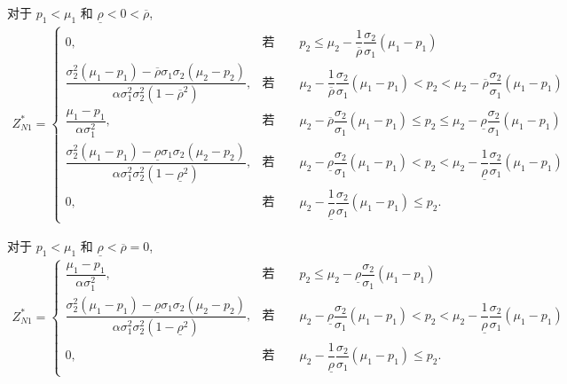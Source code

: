 \documentclass[10.0pt]{article}
\begin{document}
对于 $ p_1 < \mu_1 $ 和 $ \underline{\rho} < 0 < \overline{\rho} $,
{\footnotesize \begin{eqnarray}
Z_{N 1}^* = \left\{ \begin{matrix}
0, & \text{若} \qquad p_2 \leqslant \mu_2 - \dfrac1{\overline{\rho}} \dfrac{\sigma_2}{\sigma_1} (\mu_1 - p_1) \\
\dfrac{\sigma_2^2 (\mu_1 - p_1) - \overline{\rho} \sigma_1 \sigma_2 (\mu_2 - p_2)}{\alpha \sigma_1^2 \sigma_2^2 (1 - \overline{\rho}^2)}, & \text{若} \qquad \mu_2 - \dfrac1{\overline{\rho}} \dfrac{\sigma_2}{\sigma_1} (\mu_1 - p_1) < p_2 < \mu_2 - \overline{\rho} \dfrac{\sigma_2}{\sigma_1} (\mu_1 - p_1) \\
\dfrac{\mu_1 - p_1}{\alpha \sigma_1^2}, & \text{若} \qquad \mu_2 - \overline{\rho} \dfrac{\sigma_2}{\sigma_1} (\mu_1 - p_1) \leqslant p_2 \leqslant \mu_2 - \underline{\rho} \dfrac{\sigma_2}{\sigma_1} (\mu_1 - p_1) \\
\dfrac{\sigma_2^2 (\mu_1 - p_1) - \underline{\rho} \sigma_1 \sigma_2 (\mu_2 - p_2)}{\alpha \sigma_1^2 \sigma_2^2 (1 - \underline{\rho}^2)}, & \text{若} \qquad \mu_2 - \underline{\rho} \dfrac{\sigma_2}{\sigma_1} (\mu_1 - p_1) < p_2 < \mu_2 - \dfrac1{\underline{\rho}} \dfrac{\sigma_2}{\sigma_1} (\mu_1 - p_1) \\
0, & \text{若} \qquad \mu_2 - \dfrac1{\underline{\rho}} \dfrac{\sigma_2}{\sigma_1} (\mu_1 - p_1) \leqslant p_2.
\end{matrix} \right.
\end{eqnarray}}

对于 $ p_1 < \mu_1 $ 和 $ \underline{\rho} < \overline{\rho} = 0 $,
{\footnotesize \begin{eqnarray}
Z_{N 1}^* = \left\{ \begin{matrix}
\dfrac{\mu_1 - p_1}{\alpha \sigma_1^2}, & \text{若} \qquad p_2 \leqslant \mu_2 - \underline{\rho} \dfrac{\sigma_2}{\sigma_1} (\mu_1 - p_1) \\
\dfrac{\sigma_2^2 (\mu_1 - p_1) - \underline{\rho} \sigma_1 \sigma_2 (\mu_2 - p_2)}{\alpha \sigma_1^2 \sigma_2^2 (1 - \underline{\rho}^2)}, & \text{若} \qquad \mu_2 - \underline{\rho} \dfrac{\sigma_2}{\sigma_1} (\mu_1 - p_1) < p_2 < \mu_2 - \dfrac1{\underline{\rho}} \dfrac{\sigma_2}{\sigma_1} (\mu_1 - p_1) \\
0, & \text{若} \qquad \mu_2 - \dfrac1{\underline{\rho}} \dfrac{\sigma_2}{\sigma_1} (\mu_1 - p_1) \leqslant p_2.
\end{matrix} \right.
\end{eqnarray}}
\end{document}
